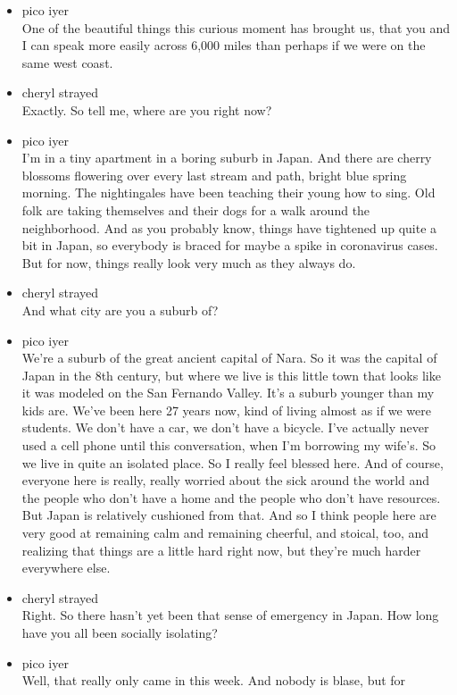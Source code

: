 \begin{itemize}
\item
  pico iyer\\
  One of the beautiful things this curious moment has brought us, that
  you and I can speak more easily across 6,000 miles than perhaps if we
  were on the same west coast.
\item
  cheryl strayed\\
  Exactly. So tell me, where are you right now?
\item
  pico iyer\\
  I'm in a tiny apartment in a boring suburb in Japan. And there are
  cherry blossoms flowering over every last stream and path, bright blue
  spring morning. The nightingales have been teaching their young how to
  sing. Old folk are taking themselves and their dogs for a walk around
  the neighborhood. And as you probably know, things have tightened up
  quite a bit in Japan, so everybody is braced for maybe a spike in
  coronavirus cases. But for now, things really look very much as they
  always do.
\item
  cheryl strayed\\
  And what city are you a suburb of?
\item
  pico iyer\\
  We're a suburb of the great ancient capital of Nara. So it was the
  capital of Japan in the 8th century, but where we live is this little
  town that looks like it was modeled on the San Fernando Valley. It's a
  suburb younger than my kids are. We've been here 27 years now, kind of
  living almost as if we were students. We don't have a car, we don't
  have a bicycle. I've actually never used a cell phone until this
  conversation, when I'm borrowing my wife's. So we live in quite an
  isolated place. So I really feel blessed here. And of course, everyone
  here is really, really worried about the sick around the world and the
  people who don't have a home and the people who don't have resources.
  But Japan is relatively cushioned from that. And so I think people
  here are very good at remaining calm and remaining cheerful, and
  stoical, too, and realizing that things are a little hard right now,
  but they're much harder everywhere else.
\item
  cheryl strayed\\
  Right. So there hasn't yet been that sense of emergency in Japan. How
  long have you all been socially isolating?
\item
  pico iyer\\
  Well, that really only came in this week. And nobody is blase, but for

\end{itemize}
